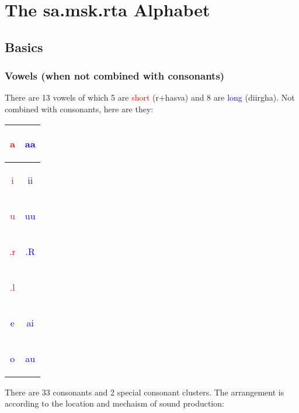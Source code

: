 \documentclass[a4paper, 12pt]{article}
\newcommand \sansletter[1]{
    \fontsize{2cm}{2.4cm}\selectfont
    \sans{#1}
}
\newcommand \eng[1]{
    \textenglish{#1}
}
\newcommand \sans[1]{
    \textsanskrit{#1}
}
\newcommand \shortsansletter[1]{
    \textcolor{red}{\sansletter{#1}}
}
\newcommand \longsansletter[1]{
    \textcolor{blue}{\sansletter{#1}}
}
\begin{document}
    \section {
        The \sans{sa.msk.rta} Alphabet
}
\subsection{Basics}
\subsubsection{Vowels (when not combined with consonants)}
\eng{
    There are 13 vowels of which 5 are \textcolor{red}{short} (\textsanskrit{r+hasva}) and 8 are \textcolor{blue}{long} (\textsanskrit{diirgha}). Not combined with consonants, here are they:
}
\begin{center}
\begin{tabular}{|c|c|}
\hline
    \shortsansletter{a} &
    \longsansletter{aa}\\ 
    \hline
    \shortsansletter{i} &
    \longsansletter{ii} \\
    \hline
    \shortsansletter{u} &
    \longsansletter{uu} \\
    \hline
    \shortsansletter{.r} &
    \longsansletter{.R}\\
    \hline
    \shortsansletter{.l} &
    \sansletter{ }\\
    \hline
    \longsansletter{e} &
    \longsansletter{ai}\\
    \hline
    \longsansletter{o} &
    \longsansletter{au}\\
\hline
\end{tabular}
\end{center}
There are 33 consonants and 2 special consonant clusters. The arrangement is according to the location and mechaism of sound production:
\end{document}
